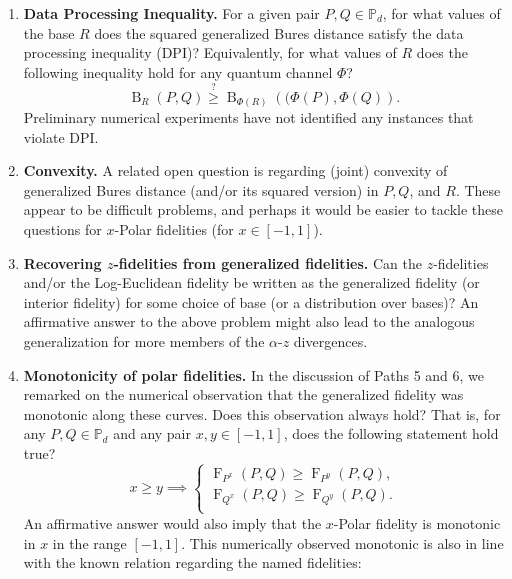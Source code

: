 \documentclass[12pt]{article}
\theoremstyle{definition}
\newcommand{\Fg}[3]{\operatorname{F}_{#3}\!\left(#1, #2\right)}
\begin{document}
\begin{enumerate}
    \item \textbf{Data Processing Inequality.} For a given pair $P,Q \in \mathbb P_d$, for what values of the base $R$ does the squared generalized Bures distance satisfy the data processing inequality (DPI)? Equivalently, for what values of $R$ does the following inequality hold for any quantum channel $\Phi$? 
    \begin{equation}
    \operatorname{B}_R(P,Q) \overset{?} {\geq}\operatorname{B}_{\Phi(R)}\left((\Phi(P), \Phi(Q) \right). 
    \end{equation} 
    Preliminary numerical experiments have not identified any instances that violate DPI.   
    \item \textbf{Convexity.} A related open question is regarding (joint) convexity of generalized Bures distance (and/or its squared version) in $P, Q$, and $R$. These appear to be difficult problems, and perhaps it would be easier to tackle these questions for $x$-Polar fidelities (for $x \in [-1,1]$).
    \item \textbf{Recovering $z$-fidelities from generalized fidelities.} Can the $z$-fidelities and/or the Log-Euclidean fidelity be written as the generalized fidelity (or interior fidelity) for some choice of base (or a distribution over bases)? An affirmative answer to the above problem might also lead to the analogous generalization for more members of the $\alpha$-$z$ divergences. 
    \item \textbf{Monotonicity of polar fidelities.} In the discussion of Paths 5 and 6, we remarked on the numerical observation that the generalized fidelity was monotonic along these curves. Does this observation always hold? That is, for any $P,Q \in \mathbb P_d$ and any pair $x, y \in [-1,1]$, does the following statement hold true?
    \begin{equation}
        x \geq y \implies \begin{cases}
            \Fg{P}{Q}{P^x}  \geq \Fg{P}{Q}{P^y}, \\
            \Fg{P}{Q}{Q^x}  \geq \Fg{P}{Q}{Q^y}. \\
         \end{cases}
    \end{equation}
    An affirmative answer would also imply that the $x$-Polar fidelity is monotonic in $x$ in the range $[-1,1]$. This numerically observed monotonic is also in line with the known relation regarding the named fidelities:
    \begin{equation}

\end{equation}
\end{enumerate}
\end{document}
